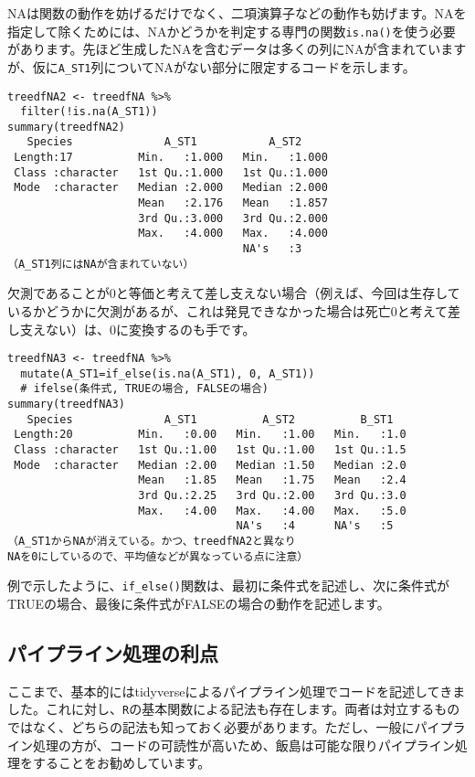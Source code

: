 NAは関数の動作を妨げるだけでなく、二項演算子などの動作も妨げます。NAを指定して除くためには、NAかどうかを判定する専門の関数\verb|is.na()|を使う必要があります。先ほど生成したNAを含むデータは多くの列にNAが含まれていますが、仮に\verb|A_ST1|列についてNAがない部分に限定するコードを示します。
\begin{verbatim}
treedfNA2 <- treedfNA %>%
  filter(!is.na(A_ST1))
summary(treedfNA2)
   Species              A_ST1           A_ST2      
 Length:17          Min.   :1.000   Min.   :1.000  
 Class :character   1st Qu.:1.000   1st Qu.:1.000  
 Mode  :character   Median :2.000   Median :2.000  
                    Mean   :2.176   Mean   :1.857  
                    3rd Qu.:3.000   3rd Qu.:2.000  
                    Max.   :4.000   Max.   :4.000  
                                    NA's   :3 
（A_ST1列にはNAが含まれていない）
 \end{verbatim}

欠測であることが0と等価と考えて差し支えない場合（例えば、今回は生存しているかどうかに欠測があるが、これは発見できなかった場合は死亡0と考えて差し支えない）は、0に変換するのも手です。
\begin{verbatim}
treedfNA3 <- treedfNA %>%
  mutate(A_ST1=if_else(is.na(A_ST1), 0, A_ST1))
  # ifelse(条件式, TRUEの場合, FALSEの場合)
summary(treedfNA3)
   Species              A_ST1          A_ST2          B_ST1    
 Length:20          Min.   :0.00   Min.   :1.00   Min.   :1.0  
 Class :character   1st Qu.:1.00   1st Qu.:1.00   1st Qu.:1.5  
 Mode  :character   Median :2.00   Median :1.50   Median :2.0  
                    Mean   :1.85   Mean   :1.75   Mean   :2.4  
                    3rd Qu.:2.25   3rd Qu.:2.00   3rd Qu.:3.0  
                    Max.   :4.00   Max.   :4.00   Max.   :5.0  
                                   NA's   :4      NA's   :5    
（A_ST1からNAが消えている。かつ、treedfNA2と異なり
NAを0にしているので、平均値などが異なっている点に注意）
\end{verbatim}
例で示したように、\verb|if_else()|関数は、最初に条件式を記述し、次に条件式がTRUEの場合、最後に条件式がFALSEの場合の動作を記述します。

  \subsection{パイプライン処理の利点}
ここまで、基本的にはtidyverseによるパイプライン処理でコードを記述してきました。これに対し、\texttt{R}の基本関数による記法も存在します。両者は対立するものではなく、どちらの記法も知っておく必要があります。ただし、一般にパイプライン処理の方が、コードの可読性が高いため、飯島は可能な限りパイプライン処理をすることをお勧めしています。

